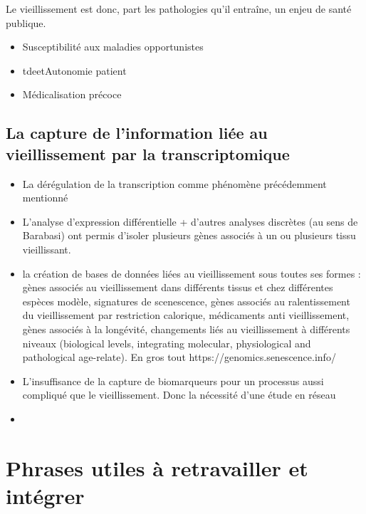 Le vieillissement est donc, part les pathologies qu'il entraîne, un enjeu de santé publique.


\begin{itemize}
    \item Susceptibilité aux maladies opportunistes
    \item tdeetAutonomie patient
    \item Médicalisation précoce
\end{itemize}

\subsection{La capture de l'information liée au vieillissement par la transcriptomique}
\label{}

\begin{itemize}
    \item La dérégulation de la transcription comme phénomène précédemment mentionné
    \item L'analyse d'expression différentielle + d'autres analyses discrètes (au sens de Barabasi) ont permis d'isoler plusieurs gènes associés à un ou plusieurs tissu vieillissant. \label{intro_biomarker_aging}
    \item la création de bases de données liées au vieillissement sous toutes ses formes : gènes associés au vieillissement dans différents tissus et chez différentes espèces modèle, signatures de scenescence, gènes associés au ralentissement du vieillissement par restriction calorique, médicaments anti vieillissement, gènes associés à la longévité, changements liés au vieillissement à différents niveaux (biological levels, integrating molecular, physiological and pathological age-relate). En gros tout https://genomics.senescence.info/
    \item L'insuffisance de la capture de biomarqueurs pour un processus aussi compliqué que le vieillissement. Donc la nécessité d'une étude en réseau
    \item 
    
\end{itemize}

\section*{Phrases utiles à retravailler et intégrer}

